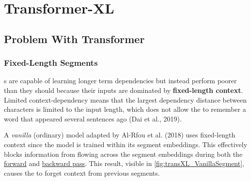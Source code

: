 \section{Transformer-XL} \label{sec:TransformerXL}

\subsection{Problem With Transformer} \label{sec:ProblemWithTransformer}


\subsubsection{Fixed-Length Segments} \label{sec:FixedLengthContext}

s are capable of learning longer term dependencies but instead perform poorer than they should because their inputs are dominated by \textbf{fixed-length context}. Limited context-dependency means that the  largest dependency distance between characters is limited to the input length, which does not allow the  to remember a word that appeared several sentences ago (Dai et al., 2019). 

A \emph{vanilla} (ordinary)  model adapted by Al-Rfou et al. (2018) uses fixed-length context since the model is trained within its segment embeddings. This effectively blocks information from flowing across the segment embeddings during both the \hyperref[sec:ForwardProp]{forward} and \hyperref[sec:BackwardProp]{backward pass}. This result, visible in \cref{fig:transXL_VanillaSegment}, causes the  to forget context from previous segments. 


